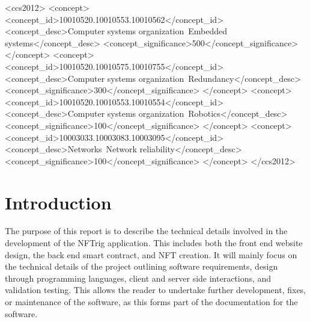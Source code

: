 \documentclass[acmsmall,nonacm]{acmart}
\begin{document}
\begin{CCSXML}
<ccs2012>
 <concept>
  <concept_id>10010520.10010553.10010562</concept_id>
  <concept_desc>Computer systems organization~Embedded systems</concept_desc>
  <concept_significance>500</concept_significance>
 </concept>
 <concept>
  <concept_id>10010520.10010575.10010755</concept_id>
  <concept_desc>Computer systems organization~Redundancy</concept_desc>
  <concept_significance>300</concept_significance>
 </concept>
 <concept>
  <concept_id>10010520.10010553.10010554</concept_id>
  <concept_desc>Computer systems organization~Robotics</concept_desc>
  <concept_significance>100</concept_significance>
 </concept>
 <concept>
  <concept_id>10003033.10003083.10003095</concept_id>
  <concept_desc>Networks~Network reliability</concept_desc>
  <concept_significance>100</concept_significance>
 </concept>
</ccs2012>
\end{CCSXML}



\maketitle

\section{Introduction}
The purpose of this report is to describe the technical details involved in the development of the NFTrig application. This includes both the front end website design, the back end smart contract, and NFT creation. It will mainly focus on the technical details of the project outlining software requirements, design through programming languages, client and server side interactions, and validation testing. This allows the reader to undertake further development, fixes, or maintenance of the software, as this forms part of the documentation for the
software.
\end{document}
